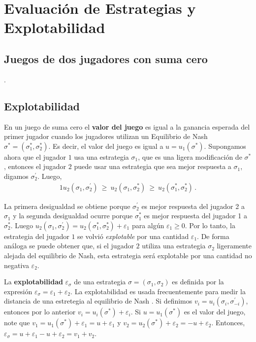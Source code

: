 \chapter{Evaluación de Estrategias y Explotabilidad}
\label{chapter:explotabilidad}

\section{Juegos de dos jugadores con suma cero}
\label{section:dos-jugadores-suma-cero}
.

\section{Explotabilidad}
\label{section:explotabilidad}

En un juego de suma cero el \textbf{valor del juego} es igual a la ganancia esperada del primer jugador cuando los jugadores utilizan un Equilibrio de Nash $\sigma^* = (\sigma^*_1, \sigma^*_2)$. Es decir, el valor del juego es igual a $u = u_1(\sigma^*)$. Supongamos ahora que el jugador $1$  usa una estrategia $\sigma_1$, que es una ligera modificación de $\sigma^*$, entonces el jugador $2$ puede usar una estrategia que sea mejor respuesta a $\sigma_1$, digamos $\sigma^{\prime}_2$. Luego,
\begin{alignat}{1}
u_2(\sigma_1, \sigma^{\prime}_2)\ \geq\ u_2(\sigma_1, \sigma^*_2)\ \geq\ u_2(\sigma^*_1, \sigma^*_2) \,.
\end{alignat}

La primera desigualdad se obtiene porque $\sigma^{\prime}_2$ es mejor respuesta del jugador 2 a $\sigma_1$ y la segunda desigualdad ocurre porque $\sigma^*_1$ es mejor respuesta del jugador 1 a $\sigma^*_2$. Luego $u_2(\sigma_1, \sigma^{\prime}_2) = u_2(\sigma^*_1, \sigma^*_2) + \varepsilon_1$ para algún $\varepsilon_1 \geq 0$. Por lo tanto, la estrategia del jugador $1$ se volvió \textit{explotable} por una cantidad $\varepsilon_1$. De forma análoga se puede obtener que, si el jugador $2$ utiliza una estrategia $\sigma_2$ ligeramente alejada del equilibrio de Nash, esta estrategia será explotable por una cantidad no negativa $\varepsilon_2$.

La \textbf{explotabilidad} $\varepsilon_\sigma$ de una estrategia $\sigma = (\sigma_1, \sigma_2)$ es definida por la expresión $\varepsilon_{\sigma} = \varepsilon_1 + \varepsilon_2$. La explotabilidad es usada frecuentemente para medir la distancia de una estretegia al equilibrio de Nash \cite[p. 7]{bib:thesis-marc-lanctot}. Si definimos $v_i = u_i(\sigma_i, \sigma^{\prime}_{-i})$, entonces por lo anterior $v_i = u_i(\sigma^*) + \varepsilon_i$. Si $u=u_1(\sigma^*)$ es el valor del juego, note que $v_1 = u_1(\sigma^*) + \varepsilon_1 = u + \varepsilon_1$ y $v_2 = u_2(\sigma^*) + \varepsilon_2 = -u + \varepsilon_2$. Entonces,  $\varepsilon_{\sigma} = u + \varepsilon_1 - u + \varepsilon_2 =  v_1 + v_2$.

